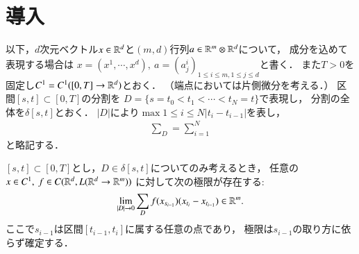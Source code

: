 \section{導入}
	以下，$d$次元ベクトル$x \in \mathbb{R}^d$と$(m, d)$行列$a \in \mathbb{R}^m \otimes \mathbb{R}^d$について，
	成分を込めて表現する場合は
	$x = (x^1,\cdots,x^d),\ a=(a^i_j)_{1 \leq i \leq m,1 \leq j \leq d}$と書く．
	また$T > 0$を固定し$C^1 = C^1([0,T] \rightarrow \mathbb{R}^d)$とおく．
	（端点においては片側微分を考える．）
	区間$[s,t] \subset [0,T]$の分割を
	$D = \{s = t_0 < t_1 < \cdots < t_N = t\}$で表現し，
	分割の全体を$\delta[s,t]$とおく．
	$|D|$により$\max{1 \leq i \leq N}{\left| t_i - t_{i-1} \right|}$を表し，
	\begin{align}
		\sum_D = \sum_{i=1}^{N}
	\end{align}
	と略記する．

	\begin{screen}
		\begin{thm}\label{thm:existence_of_Riemann_Stieltjes_integral}
			$[s,t] \subset [0,T]$とし，$D \in \delta[s,t]$についてのみ考えるとき，
			任意の$x \in C^1,\ f \in C(\mathbb{R}^d,L(\mathbb{R}^d \rightarrow \mathbb{R}^m))$
			に対して次の極限が存在する:\footnotemark
			\begin{align}
				\lim_{|D| \to 0}
				\sum_{D} f(x_{s_{i-1}})(x_{t_i} - x_{t_{i-1}})
				\in \mathbb{R}^m.
			\end{align}
			ここで$s_{i-1}$は区間$[t_{i-1},t_i]$に属する任意の点であり，
			極限は$s_{i-1}$の取り方に依らず確定する．
		\end{thm}
	\end{screen}
